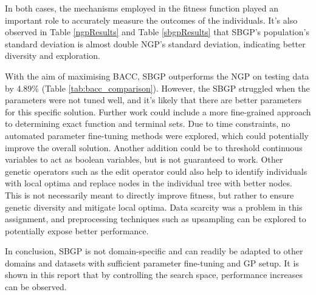 \documentclass{article}
\begin{document}
In both cases, the mechanisms employed in the fitness function played an important role to accurately measure the outcomes of the individuals. It's also observed in Table \ref{ngpResults} and Table \ref{sbgpResults} that SBGP's population's standard deviation is almost double NGP's standard deviation, indicating better diversity and exploration.

With the aim of maximising BACC, SBGP outperforms the NGP on testing data by 4.89\% (Table \ref{tab:bacc_comparison}). However, the SBGP struggled when the parameters were not tuned well, and it's likely that there are better parameters for this specific solution. Further work could include a more fine-grained approach to determining exact function and terminal sets. Due to time constraints, no automated parameter fine-tuning methods were explored, which could potentially improve the overall solution. Another addition could be to threshold continuous variables to act as boolean variables, but is not guaranteed to work. Other genetic operators such as the edit operator could also help to identify individuals with local optima and replace nodes in the individual tree with better nodes. This is not necessarily meant to directly improve fitness, but rather to ensure genetic diversity and mitigate local optima. Data scarcity was a problem in this assignment, and preprocessing techniques such as upsampling can be explored to potentially expose better performance.

In conclusion, SBGP is not domain-specific and can readily be adapted to other domains and datasets with sufficient parameter fine-tuning and GP setup. It is shown in this report that by controlling the search space, performance increases can be observed.



\end{document}
